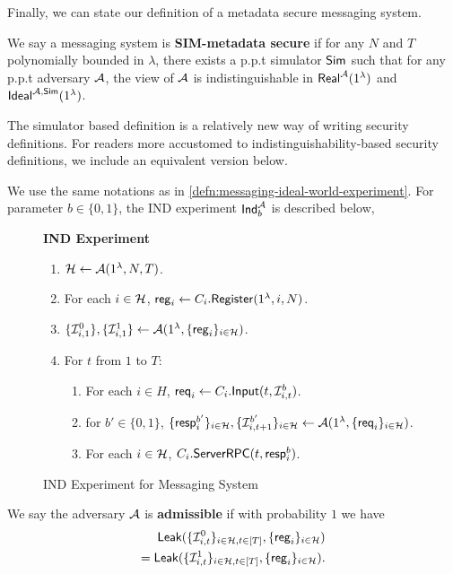 Finally, we can state our definition of a metadata secure messaging system.

\begin{definition}
\label{defn:messaging-security}
We say a messaging system is \textbf{SIM-metadata secure} if for any $N$ and $T$ polynomially bounded in $\lambda$, there exists a p.p.t simulator $\mathsf{Sim}$ such that for any p.p.t adversary $\mathcal{A}$, the view of $\mathcal{A}$ is indistinguishable in $\mathsf{Real}^{\mathcal{A}}(1^{\lambda})$ and $\mathsf{Ideal}^{\mathcal{A}, \mathsf{\mathsf{Sim}}}(1^{\lambda})$.
\end{definition}

The simulator based definition is a relatively new way of writing security definitions. For readers more accustomed to indistinguishability-based security definitions, we include an equivalent version below.
\begin{definition}
\label{defn:messaging-ind-experiment}
We use the same notations as in \cref{defn:messaging-ideal-world-experiment}. For parameter $b \in \{0, 1\}$, the IND experiment $\mathsf{Ind}_b^{\mathcal{A}}$ is described below, 
\begin{figure}[!h]
\begin{framed}
\textbf{IND Experiment}
\begin{enumerate}
\item $\mathcal{H} \leftarrow \mathcal{A}(1^{\lambda}, N, T)$.
\item For each $i \in \mathcal{H}$, $\mathsf{reg}_i \leftarrow C_i.\mathsf{Register}(1^{\lambda}, i, N)$. 
\item $\{\mathcal{I}^{0}_{i, 1}\}, \{\mathcal{I}^{1}_{i, 1}\} \leftarrow \mathcal{A}(1^{\lambda}, \{\mathsf{reg}_i\}_{i \in \mathcal{H}})$.
\item For $t$ from $1$ to $T$:
    \begin{enumerate}
    \item For each $i \in H$, $\mathsf{req}_i \leftarrow C_i.\mathsf{Input}(t, \mathcal{I}^{b}_{i, t})$.
    
    \item for $b'\in \{0, 1\}$, $\{\mathsf{resp}^{b'}_i\}_{i \in \mathcal{H}},\{\mathcal{I}^{b'}_{i, t + 1}\}_{i \in \mathcal{H}} \leftarrow \mathcal{A}(1^{\lambda}, \{\mathsf{req}_i\}_{i \in \mathcal{H}})$.
    
    \item For each $i \in \mathcal{H}$, $C_i.\mathsf{ServerRPC}(t, \mathsf{resp}^{b}_i)$.
    \end{enumerate}
\end{enumerate}
\end{framed}
\label{expr:messaging-IND}
\caption{IND Experiment for Messaging System}
\end{figure}

We say the adversary $\mathcal{A}$ is \textbf{admissible} if with probability $1$ we have
\begin{align*}
\mathsf{Leak}(\{\mathcal{I}^{0}_{i, t}\}_{i \in \mathcal{H}, t \in [T]}, \{\mathsf{reg}_i\}_{i \in \mathcal{H}}) \\
= \mathsf{Leak}(\{\mathcal{I}^{1}_{i, t}\}_{i \in \mathcal{H}, t \in [T]}, \{\mathsf{reg}_i\}_{i \in \mathcal{H}}).    
\end{align*}
\end{definition}

